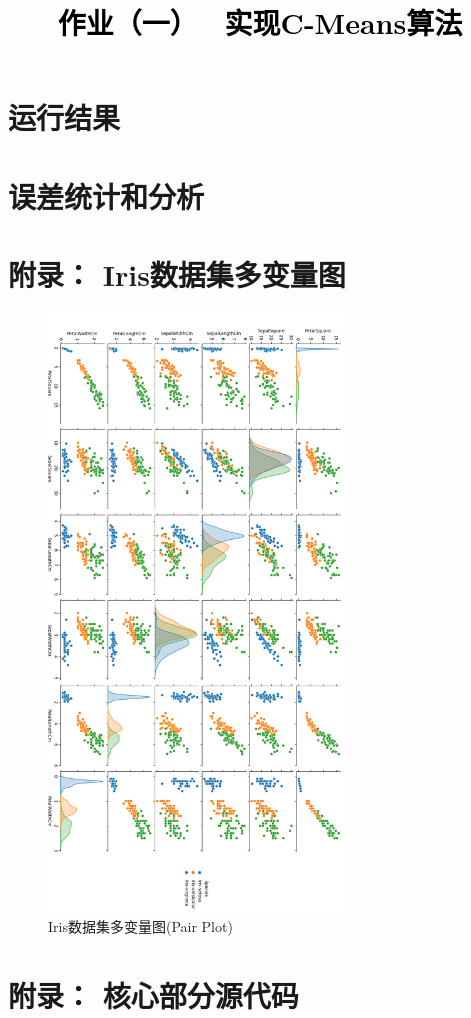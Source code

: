 \documentclass[a4paper,twoside]{article}
\newcommand{\PaperTitle}{作业（一） \ 实现C-Means算法}  %
\begin{document}
\newpage

\title{
	\Large{\textcolor{black}{\PaperTitle}}
}
	
	
\maketitle
	
\tableofcontents
 
\newpage
\begin{spacing}{1.2}
	
\section{运行结果}

\section{误差统计和分析}

\newpage
\appendix

\section{附录： Iris数据集多变量图}

\begin{figure}[H] 
	\centering
	\includegraphics[width=0.7\textwidth]{../pairplot.png} 
	\caption{Iris数据集多变量图(Pair Plot)}
	\label{Fig.main2}
\end{figure}

\section{附录： 核心部分源代码}

\end{spacing}
\end{document}
